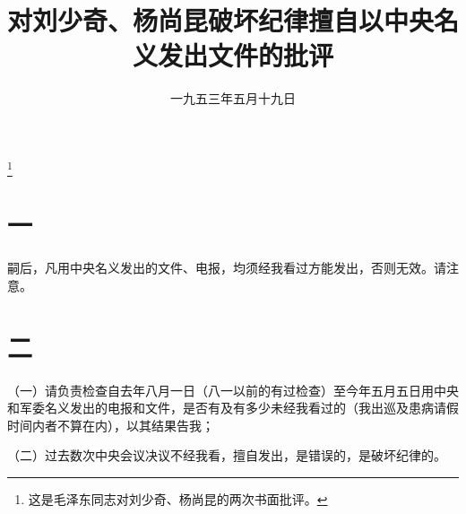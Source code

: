 
\title{对刘少奇、杨尚昆破坏纪律擅自以中央名义发出文件的批评}
\date{一九五三年五月十九日}
\thanks{这是毛泽东同志对刘少奇、杨尚昆的两次书面批评。}
\maketitle


\section*{一}

嗣后，凡用中央名义发出的文件、电报，均须经我看过方能发出，否则无效。请注意。

\section*{二}

（一）请负责检查自去年八月一日（八一以前的有过检查）至今年五月五日用中央和军委名义发出的电报和文件，是否有及有多少未经我看过的（我出巡及患病请假时间内者不算在内），以其结果告我；

（二）过去数次中央会议决议不经我看，擅自发出，是错误的，是破坏纪律的。
